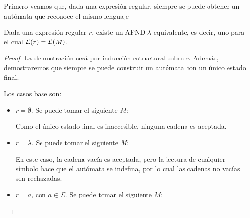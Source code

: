 Primero veamos que, dada una expresión regular, siempre se puede obtener un autómata que reconoce el mismo lenguaje

\begin{theorem*}
    Dada una expresión regular $r$, existe un AFND-$\lambda$ equivalente, es decir, uno para el cual $\mathcal{L}(r) = \mathcal{L}(M)$.
\end{theorem*}
\begin{proof}
    La demostración será por inducción estructural sobre $r$. Además, demostraremos que siempre se puede construir un autómata con un único estado final.

    Los casos base son:
    \begin{itemize}
        \item $r = \emptyset$. Se puede tomar el siguiente $M$:
              \begin{figure}[H]
                  \centering
              \end{figure}

              Como el único estado final es inaccesible, ninguna cadena es aceptada.
        \item $r = \lambda$. Se puede tomar el siguiente $M$:
              \begin{figure}[H]
                  \centering
              \end{figure}

              En este caso, la cadena vacía es aceptada, pero la lectura de cualquier símbolo hace que el autómata se indefina, por lo cual las cadenas no vacías son rechazadas.
        \item $r = a$, con $a \in \Sigma$. Se puede tomar el siguiente $M$:
              \begin{figure}[H]
                  \centering
              \end{figure}


\end{itemize}
\end{proof}

